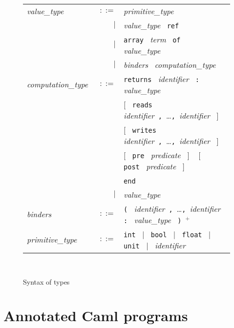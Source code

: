 \documentclass[a4paper,12pt]{report}
\newcommand{\te}[1]{\texttt{#1}~}
\newcommand{\nt}[1]{\textsl{#1}~}
\begin{document}
\begin{figure}[htbp]
\begin{center}
\hrulefill\\
\begin{tabular}{lrl}
  \nt{value\_type}
    & $::=$ & \nt{primitive\_type} \\
      & $|$ & \nt{value\_type} \te{ref} \\
      & $|$ & \te{array} \nt{term} \te{of} \nt{value\_type} \\
      & $|$ & \nt{binders} \nt{computation\_type} 
  \\[0.1em]

  \nt{computation\_type}
    & $::=$ & \te{returns} \nt{identifier} \te{:} \nt{value\_type} \\
      &     & $[$~ \te{reads} 
                   \nt{identifier}\te{,}\ldots\te{,}\nt{identifier} $]$~ \\
      &     & $[$~ \te{writes} 
                   \nt{identifier}\te{,}\ldots\te{,}\nt{identifier} $]$~ \\
      &     & $[$~ \te{pre} \nt{predicate} $]$ ~ 
              $[$~ \te{post} \nt{predicate} $]$ \\
      &     & \te{end} \\
      & $|$ & \nt{value\_type}
  \\[0.1em]

  \nt{binders}
    & $::=$ & \te{(} \nt{identifier}\te{,}\dots\te{,}\nt{identifier}  \te{:}
              \nt{value\_type}  \te{)}$^+$ 
  \\[0.1em]

  \nt{primitive\_type}
    & $::=$ & \te{int} $|$~ \te{bool} $|$~ \te{float} $|$~ 
              \te{unit} $|$~ \nt{identifier}
\end{tabular}\\
\hrulefill
\caption{Syntax of types}
\label{fig:types}
\end{center}            
\end{figure}

\section{Annotated Caml programs}
\end{document}
